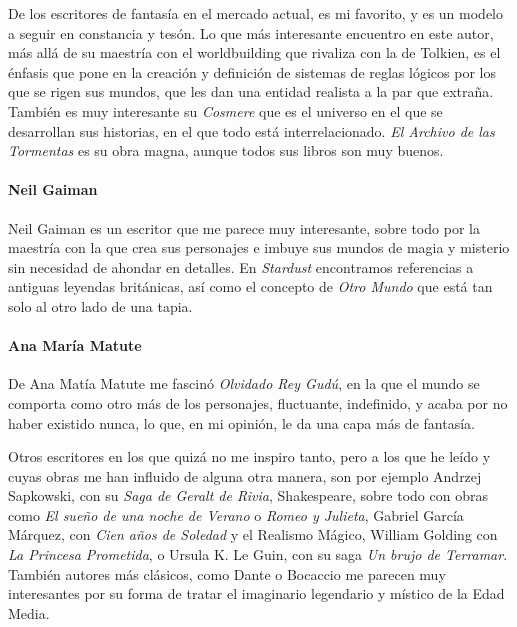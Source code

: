 \documentclass[twoside]{article}
\begin{document}
\begin{multicols}{2}
  De los escritores de fantasía en el mercado actual, es mi favorito, y es
  un modelo a seguir en constancia y tesón. Lo que más interesante
  encuentro en este autor, más allá de su maestría con el worldbuilding
  que rivaliza con la de Tolkien, es el énfasis que pone en la creación y
  definición de sistemas de reglas lógicos por los que se rigen sus
  mundos, que les dan una entidad realista a la par que extraña. También
  es muy interesante su \emph{Cosmere} que es el universo en el que se
  desarrollan sus historias, en el que todo está interrelacionado.
  \emph{El Archivo de las Tormentas}\autocite*{sanderson2020} es su obra magna, aunque
  todos sus libros son muy buenos.
  
  \hypertarget{neil-gaiman}{%
  \paragraph{Neil Gaiman}\label{neil-gaiman}}
  
  Neil Gaiman es un escritor que me parece muy interesante, sobre todo por
  la maestría con la que crea sus personajes e imbuye sus mundos de magia
  y misterio sin necesidad de ahondar en detalles. En
  \emph{Stardust}\autocite*{gaiman2021} encontramos referencias a antiguas leyendas británicas,
  así como el concepto de \emph{Otro Mundo} que está tan solo al otro
  lado de una tapia.
  
  \hypertarget{ana-maruxeda-matute}{%
  \paragraph{Ana María Matute}\label{ana-maruxeda-matute}}
  
  De Ana Matía Matute me fascinó \emph{Olvidado Rey Gudú}\autocite*{matute}, en la que el
  mundo se comporta como otro más de los personajes, fluctuante,
  indefinido, y acaba por no haber existido nunca, lo que, en mi opinión,
  le da una capa más de fantasía.
  
  Otros escritores en los que quizá no me inspiro tanto, pero a los que he
  leído y cuyas obras me han influido de alguna otra manera, son por
  ejemplo Andrzej Sapkowski, con su \emph{Saga de Geralt de Rivia}\autocite*{rivia}, Shakespeare,
  sobre todo con obras como \emph{El sueño de una noche de Verano} o
  \emph{Romeo y Julieta}\autocite*{shakespeare}, Gabriel García Márquez, con \emph{Cien años de
  Soledad}\autocite*{garcia} y el Realismo Mágico, William Golding con \emph{La Princesa
  Prometida}\autocite*{goldmanfilipettovidal2013}, o Ursula K. Le Guin, con su saga \emph{Un brujo de
  Terramar}\autocite*{terramar}. También autores más clásicos, como Dante o Bocaccio me
  parecen muy interesantes por su forma de tratar el imaginario legendario
  y místico de la Edad Media.
  

\end{multicols}
\end{document}
